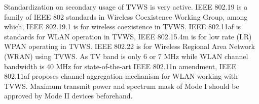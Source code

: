 %
%
Standardization on secondary usage of TVWS is very active. IEEE 802.19 is a family of IEEE 802 standards in Wireless Coexistence Working Group, among which, IEEE 802.19.1 is for wireless coexistence in TVWS. IEEE 802.11af is standards for WLAN operation in TVWS, IEEE 802.15.4m is for low rate (LR) WPAN operating in TVWS. IEEE 802.22 is for Wireless Regional Area Network (WRAN) using TVWS. As TV band is only 6 or 7 MHz while WLAN channel bandwidth is 40 MHz for state-of-the-art IEEE 802.11n amendment, IEEE 802.11af proposes channel aggregation mechanism for WLAN working with TVWS. Maximum transmit power and spectrum mask of Mode I should be approved by Mode II devices beforehand.  




